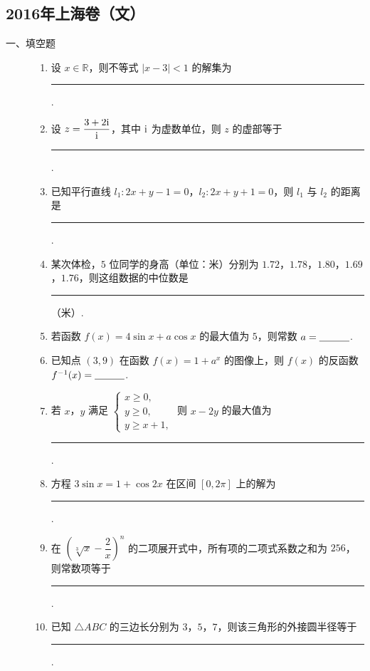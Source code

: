 \subsection{2016年上海卷（文）}\label{gk:2016年上海卷（文）}

\begin{description}

    \item[一、填空题]

    \begin{enumerate}[leftmargin=5pt]

        \item 设 \(x\in\mathbb{R}\)，则不等式 \(|x-3|<1\) 的解集为\rule[-0.3ex]{3em}{0.4pt}.

        \item 设 \(z=\dfrac{3+2\mathrm{i}}{\mathrm{i}}\)，其中 \(\mathrm{i}\) 为虚数单位，则 \(z\) 的虚部等于\rule[-0.3ex]{3em}{0.4pt}.

        \item 已知平行直线 \(l_1:2x+y-1=0\)，\(l_2:2x+y+1=0\)，则 \(l_1\) 与 \(l_2\) 的距离是\rule[-0.3ex]{3em}{0.4pt}.

        \item 某次体检，\(5\) 位同学的身高（单位：米）分别为 \(1.72\)，\(1.78\)，\(1.80\)，\(1.69\)，\(1.76\)，则这组数据的中位数是\rule[-0.3ex]{3em}{0.4pt}（米）.

        \item 若函数 \(f(x)=4\sin x+a\cos x\) 的最大值为 \(5\)，则常数 \(a=\rule[-0.3ex]{3em}{0.4pt}\).

        \item 已知点 \((3,9)\) 在函数 \(f(x)=1+a^x\) 的图像上，则 \(f(x)\) 的反函数 \(f^{-1}(x)=\rule[-0.3ex]{3em}{0.4pt}\).

        \item 若 \(x\)，\(y\) 满足
\(
\begin{cases}
x\ge0,\\
y\ge0,\\
y\ge x+1,
\end{cases}
\)
则 \(x-2y\) 的最大值为\rule[-0.3ex]{3em}{0.4pt}.

        \item 方程 \(3\sin x=1+\cos2x\) 在区间 \([0,2\pi]\) 上的解为\rule[-0.3ex]{3em}{0.4pt}.

        \item 在 \(\left(\sqrt[3]{x}-\dfrac2x\right)^n\) 的二项展开式中，所有项的二项式系数之和为 \(256\)，则常数项等于\rule[-0.3ex]{3em}{0.4pt}.

        \item 已知 \(\triangle ABC\) 的三边长分别为 \(3\)，\(5\)，\(7\)，则该三角形的外接圆半径等于\rule[-0.3ex]{3em}{0.4pt}.


\end{enumerate}
\end{description}
